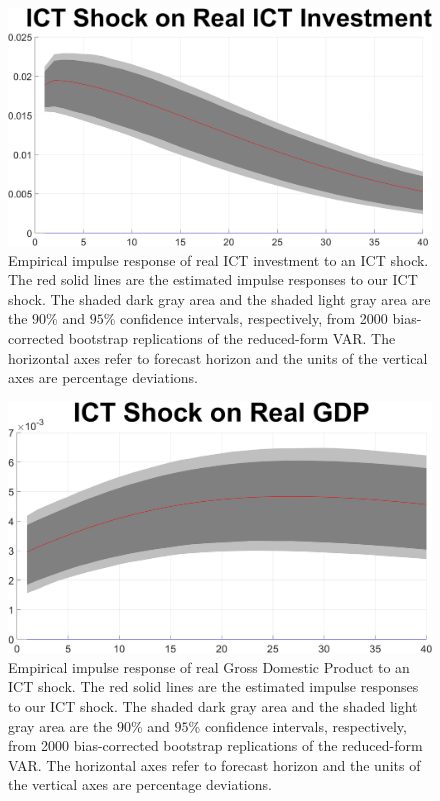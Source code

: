 \documentclass[12pt]{article}
\begin{document}
\newpage




	\begin{figure}[h!]
		\begin{center}
		\includegraphics[scale=0.35]{MainFigures/fig_ICT_Shock_on_Real_ICT_Investment_empirical_noH}
		\caption{Empirical impulse response of real ICT investment to an ICT shock. The red solid lines are the estimated impulse responses to our ICT shock. The shaded dark gray area and the shaded light gray area are the $90$\% and $95$\% confidence intervals, respectively, from 2000 bias-corrected bootstrap replications of the reduced-form VAR. The horizontal axes refer to forecast horizon and the units of the vertical axes are percentage deviations.}
		\label{fig:ICT_main}
	\end{center} 
	\end{figure}

\newpage


	\begin{figure}[h!]
	\begin{center}
		\includegraphics[scale=0.35]{MainFigures/fig_ICT_Shock_on_Real_GDP_empirical_noH}
		\caption{Empirical impulse response of real Gross Domestic Product to an ICT shock. The red solid lines are the estimated impulse responses to our ICT shock. The shaded dark gray area and the shaded light gray area are the $90$\% and $95$\% confidence intervals, respectively, from 2000 bias-corrected bootstrap replications of the reduced-form VAR. The horizontal axes refer to forecast horizon and the units of the vertical axes are percentage deviations.}
		\label{fig:GDP_main}
	\end{center} 
\end{figure}
\end{document}
